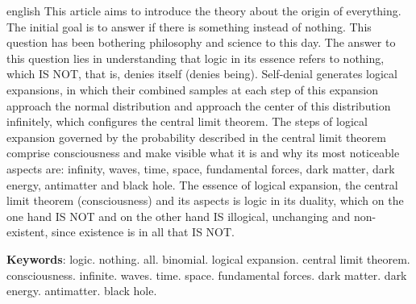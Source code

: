 \vspace{1mm}
\renewcommand{\resumoname}{Abstract}
\begin{resumoumacoluna}
 \begin{otherlanguage*}{english}
\vspace{-2mm}
	This article aims to introduce the theory about the origin of everything. The initial goal is to answer if there is something instead of nothing. This question has been bothering philosophy and science to this day. The answer to this question lies in understanding that logic in its essence refers to nothing, which IS NOT, that is, denies itself (denies being). Self-denial generates logical expansions, in which their combined samples at each step of this expansion approach the normal distribution and approach the center of this distribution infinitely, which configures the central limit theorem. The steps of logical expansion governed by the probability described in the central limit theorem comprise consciousness and make visible what it is and why its most noticeable aspects are: infinity, waves, time, space, fundamental forces, dark matter, dark energy, antimatter and black hole. The essence of logical expansion, the central limit theorem (consciousness) and its aspects is logic in its duality, which on the one hand IS NOT and on the other hand IS illogical, unchanging and non-existent, since existence is in all that IS NOT.
	\noindent
	
	\textbf{Keywords}: logic. nothing. all. binomial. logical expansion. central limit theorem. consciousness. infinite. waves. time. space. fundamental forces. dark matter. dark energy. antimatter. black hole.
 \end{otherlanguage*}  
\end{resumoumacoluna}
